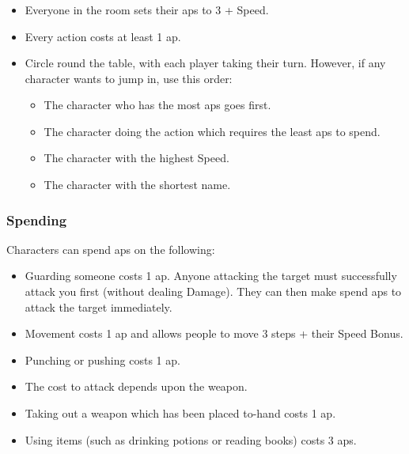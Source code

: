\subsubsection*{}

\begin{itemize}

  \item
  Everyone in the room sets their \glspl{ap} to 3 + Speed.
  \item
  Every action costs at least 1 \gls{ap}.
  \item
  Circle round the table, with each player taking their turn.
  However, if any character wants to jump in, use this order:
  \begin{itemize}
    \item
    The character who has the most \glspl{ap} goes first.
    \item
    The character doing the action which requires the least \glspl{ap} to spend.
    \item
    The character with the highest Speed.
    \item
    The character with the shortest name.
  \end{itemize}
\end{itemize}

\subsubsection*{Spending }

Characters can spend \glspl{ap} on the following:

\begin{itemize}
  \item
  Guarding someone costs 1 \gls{ap}.
  Anyone attacking the target must successfully attack you first (without dealing Damage).
  They can then make spend \glspl{ap} to attack the target immediately.
  \item
  Movement costs 1 \gls{ap} and allows people to move 3 steps + their Speed Bonus.
  \item
  Punching or pushing costs 1 \gls{ap}.
  \item
  The cost to attack depends upon the weapon.
  \item
  Taking out a weapon which has been placed to-hand costs 1 \gls{ap}.
  \item
  Using items (such as drinking potions or reading books) costs 3 \glspl{ap}.
\end{itemize}

